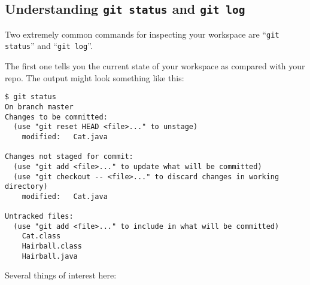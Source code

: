 \subsection{Understanding \texttt{git status} and \texttt{git log}}

Two extremely common commands for inspecting your workspace are ``\texttt{git
status}'' and ``\texttt{git log}''.

The first one tells you the current state of your workspace as compared with
your repo. The output might look something like this:

\begin{Verbatim}[fontsize=\footnotesize,samepage=true,frame=single]
$ git status
On branch master
Changes to be committed:
  (use "git reset HEAD <file>..." to unstage)
    modified:   Cat.java

Changes not staged for commit:
  (use "git add <file>..." to update what will be committed)
  (use "git checkout -- <file>..." to discard changes in working directory)
    modified:   Cat.java

Untracked files:
  (use "git add <file>..." to include in what will be committed)
    Cat.class
    Hairball.class
    Hairball.java
\end{Verbatim}

\pagebreak
Several things of interest here:

